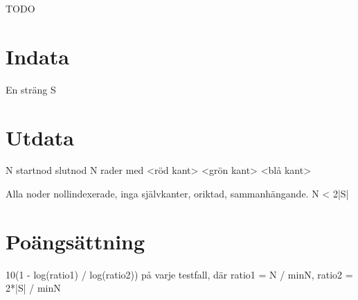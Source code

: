 \def\version{1}
TODO

\section*{Indata}
En sträng S

\section*{Utdata}
N startnod slutnod
N rader med <röd kant> <grön kant> <blå kant>

Alla noder nollindexerade, inga självkanter, oriktad, sammanhängande.
N < 2|S|

\section*{Poängsättning}
10(1 - log(ratio1) / log(ratio2)) på varje testfall, där ratio1 = N / minN, ratio2 = 2*|S| / minN
